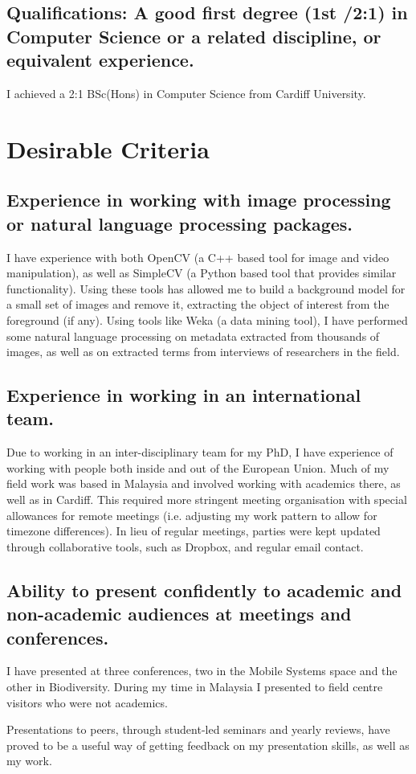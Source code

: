\documentclass[10pt,a4paper]{article}
\begin{document}
\subsection{Qualifications: A good first degree (1st /2:1) in Computer Science or a related discipline, or equivalent experience.}
I achieved a 2:1 BSc(Hons) in Computer Science from Cardiff University.

\section{Desirable Criteria}
\subsection{Experience in working with image processing or natural language processing packages.}
I have experience with both OpenCV (a C++ based tool for image and video manipulation), as well as SimpleCV (a Python based tool that provides similar functionality). Using these tools has allowed me to build a background model for a small set of images and remove it, extracting the object of interest from the foreground (if any). 
Using tools like Weka (a data mining tool), I have performed some natural language processing on metadata extracted from thousands of images, as well as on extracted terms from interviews of researchers in the field.

\subsection{Experience in working in an international team.}
Due to working in an inter-disciplinary team for my PhD, I have experience of working with people both inside and out of the European Union. Much of my field work was based in Malaysia and involved working with academics there, as well as in Cardiff. This required more stringent meeting organisation with special allowances for remote meetings (i.e. adjusting my work pattern to allow for timezone differences). In lieu of regular meetings, parties were kept updated through collaborative tools, such as Dropbox, and regular email contact.

\subsection{Ability to present confidently to academic and non-academic audiences at meetings and conferences.}
I have presented at three conferences, two in the Mobile Systems space and the other in Biodiversity. During my time in Malaysia I presented to field centre visitors who were not academics.

Presentations to peers, through student-led seminars and yearly reviews, have proved to be a useful way of getting feedback on my presentation skills, as well as my work.
\end{document}
